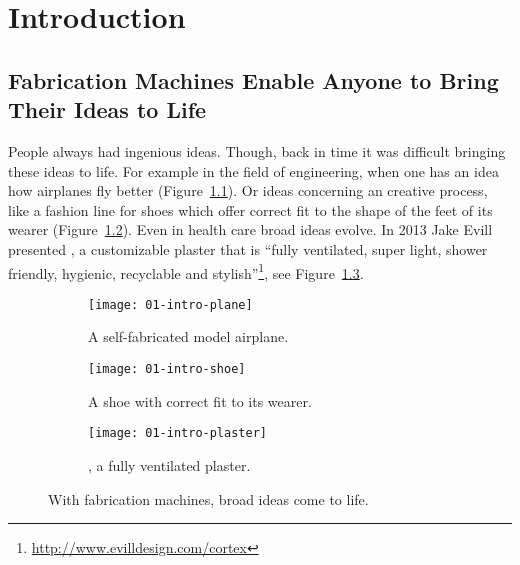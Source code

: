 \documentclass[../ClassicThesis.tex]{subfiles}
\begin{document}
\chapter{Introduction}
\label{ch:introduction}

\section{Fabrication Machines Enable Anyone to Bring Their Ideas to Life}


People always had ingenious ideas. Though, back in time it was
difficult bringing these ideas to life. For example in the field of
engineering, when one has an idea how airplanes fly better
(Figure~\ref{fig:intro-ideas:plane}). Or ideas concerning an creative
process, like a fashion line for shoes which offer correct fit to the
shape of the feet of its wearer (Figure~\ref{fig:intro-ideas:shoe}).
Even in health care broad ideas evolve. In 2013 Jake Evill presented
, a customizable plaster that is \enquote{fully
  ventilated, super light, shower friendly, hygienic, recyclable and
  stylish}\footnote{\url{http://www.evilldesign.com/cortex}}, see
Figure~\ref{fig:intro-ideas:plaster}. 

\begin{figure}[h]
  \centering
  \begin{subfigure}[b]{0.321\textwidth}
    \centering
    \texttt{[image: 01-intro-plane]}
    \caption{A self-fabricated model airplane.}
    \label{fig:intro-ideas:plane}
  \end{subfigure}
  \begin{subfigure}[b]{0.321\textwidth}
    \centering
    \texttt{[image: 01-intro-shoe]}
    \caption{A shoe with correct fit to its wearer.}
    \label{fig:intro-ideas:shoe}
  \end{subfigure}
  \begin{subfigure}[c]{0.321\textwidth}
    \centering
    \texttt{[image: 01-intro-plaster]}
    \caption{, a fully ventilated plaster.}
    \label{fig:intro-ideas:plaster}
  \end{subfigure}
  \caption{With fabrication machines, broad ideas come to life.}
  \label{fig:intro-ideas}
\end{figure}
\end{document}
